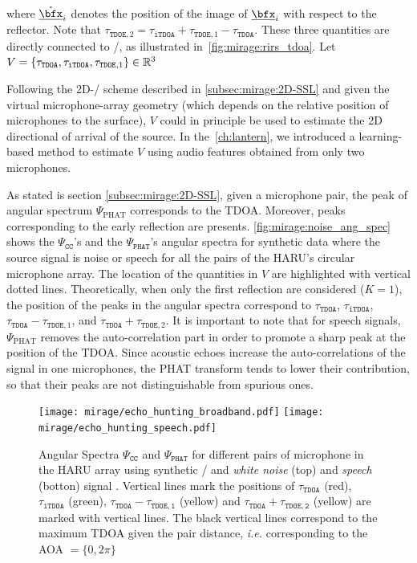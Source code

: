 where $\mathring{\positionMicrophone}_i$ denotes the position of the image of $\positionMicrophone_i$ with respect to the reflector.
Note that $\tau_{\mathtt{TDOE},2} = \tau_\mathtt{iTDOA} + \tau_{\mathtt{TDOE}, 1} - \tau_\mathtt{TDOA}$.
These three quantities are directly connected to \RIRs/, as illustrated in~\cref{fig:mirage:rirs_tdoa}.
Let $V = \set{\tau_{\mathtt{TDOA}}, \tau_{\mathtt{iTDOA}}, \tau_{\mathtt{TDOE},1}}\in\mathbb{R}^3$


\mynewline
Following the 2D-\SSL/ scheme described in \cref{subsec:mirage:2D-SSL} and given the virtual microphone-array geometry (which depends on the relative position of microphones to the surface),
$V$ could in principle be used to estimate the 2D directional of arrival of the source.
In the~\cref{ch:lantern}, we introduced a learning-based method to estimate $V$ using audio features obtained from only two microphones.

\mynewline
As stated is section \ref{subsec:mirage:2D-SSL}, given a microphone pair, the peak of angular spectrum $\Psi_\text{PHAT}$ corresponds to the \ac{TDOA}.
Moreover, peaks corresponding to the early reflection are presents.
\cref{fig:mirage:noise_ang_spec} shows the $\Psi_\mathtt{CC}$'s and the $\Psi_\mathtt{PHAT}$'s angular spectra for synthetic data where the source signal is noise or speech for all the pairs of the HARU's circular microphone array.
The location of the quantities in $V$ are highlighted with vertical dotted lines.
Theoretically, when only the first reflection are considered ($K=1$), the position of the peaks in the angular spectra correspond to
$\tau_\mathtt{TDOA}$, $\tau_\mathtt{iTDOA}$, $\tau_\mathtt{TDOA} - \tau_{\mathtt{TDOE}, 1}$, and $\tau_\mathtt{TDOA} + \tau_{\mathtt{TDOE}, 2}$.
It is important to note that for speech signals, $\Psi_\text{PHAT}$ removes the auto-correlation part in order to promote a sharp peak at the position of the \ac{TDOA}.
Since acoustic echoes increase the auto-correlations of the signal in one microphones, the \ac{PHAT} transform tends to lower their contribution, so that their peaks are not distinguishable from spurious ones.
\begin{figure}
    \begin{fullwidth}
        \centering
        \texttt{[image: mirage/echo\_hunting\_broadband.pdf]}
        \texttt{[image: mirage/echo\_hunting\_speech.pdf]}
        \caption{
            Angular Spectra $\Psi_\mathtt{CC}$ and $\Psi_\texttt{PHAT}$ for different pairs of microphone in the HARU array using synthetic \RIRs/ and \textit{white noise} (top) and \textit{speech} (botton) signal .
            Vertical lines mark the positions of  $\tau_\mathtt{TDOA}$ (red), $\tau_\mathtt{iTDOA}$ (green), $\tau_\mathtt{TDOA}-\tau_\mathtt{TDOE,1}$ (yellow) and $\tau_\mathtt{TDOA}+\tau_\mathtt{TDOE,2}$ (yellow) are marked with vertical lines.
            The black vertical lines correspond to the maximum TDOA given the pair distance, \textit{i.e.} corresponding to the AOA $ = \{0, 2\pi\}$}
        \label{fig:mirag:noise_ang_spec}
    \end{fullwidth}
\end{figure}


